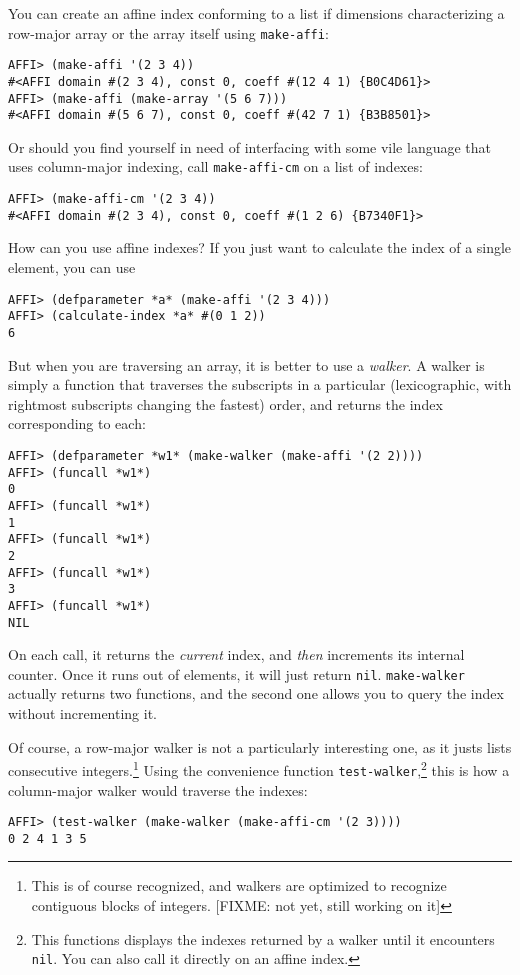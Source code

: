 \documentclass[letterpaper,11pt]{article}
\begin{document}
You can create an affine index conforming to a list if dimensions
characterizing a row-major array or the array itself using
\lstinline!make-affi!:
\begin{lstlisting}
AFFI> (make-affi '(2 3 4))
#<AFFI domain #(2 3 4), const 0, coeff #(12 4 1) {B0C4D61}>
AFFI> (make-affi (make-array '(5 6 7)))
#<AFFI domain #(5 6 7), const 0, coeff #(42 7 1) {B3B8501}>
\end{lstlisting}

Or should you find yourself in need of interfacing with some vile
language that uses column-major indexing, call
\lstinline!make-affi-cm! on a list of indexes:
\begin{lstlisting}
AFFI> (make-affi-cm '(2 3 4))
#<AFFI domain #(2 3 4), const 0, coeff #(1 2 6) {B7340F1}>
\end{lstlisting}

How can you use affine indexes?  If you just want to calculate the
index of a single element, you can use
\begin{lstlisting}
AFFI> (defparameter *a* (make-affi '(2 3 4)))
AFFI> (calculate-index *a* #(0 1 2))
6
\end{lstlisting}

But when you are traversing an array, it is better to use a
\emph{walker}.  A walker is simply a function that traverses the
subscripts in a particular (lexicographic, with rightmost subscripts
changing the fastest) order, and returns the index corresponding to
each:
\begin{lstlisting}
AFFI> (defparameter *w1* (make-walker (make-affi '(2 2))))
AFFI> (funcall *w1*)
0
AFFI> (funcall *w1*)
1
AFFI> (funcall *w1*)
2
AFFI> (funcall *w1*)
3
AFFI> (funcall *w1*)
NIL
\end{lstlisting}
On each call, it returns the \emph{current} index, and \emph{then}
increments its internal counter.  Once it runs out of elements, it
will just return \lstinline!nil!.  \lstinline!make-walker! actually
returns two functions, and the second one allows you to query the
index without incrementing it.

Of course, a row-major walker is not a particularly interesting one,
as it justs lists consecutive integers.\footnote{This is of course
  recognized, and walkers are optimized to recognize contiguous blocks
  of integers. [FIXME: not yet, still working on it]} Using the
convenience function \lstinline!test-walker!,\footnote{This functions
  displays the indexes returned by a walker until it encounters
  \lstinline!nil!.  You can also call it directly on an affine index.}
this is how a column-major walker would traverse the indexes:
\begin{lstlisting}
AFFI> (test-walker (make-walker (make-affi-cm '(2 3))))
0 2 4 1 3 5 
\end{lstlisting}
\end{document}
